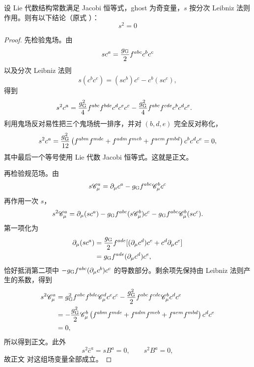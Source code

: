 \begin{proposition}
设 Lie 代数结构常数满足 Jacobi 恒等式，ghost 为奇变量，$s$ 按分次 Leibniz 法则作用。则有以下结论（原式 ）：
\begin{equation*}
 \boxed{s^2=0}
\end{equation*}
\end{proposition}
\begin{proof}
先检验鬼场。由
\begin{equation*}
 sc^a=\frac{g_{\rm G}}2f^{abc}c^bc^c
\end{equation*}
以及分次 Leibniz 法则
\begin{equation*}
 s(c^bc^c)=(sc^b)c^c-c^b(sc^c),
\end{equation*}
得到
\begin{align*}
 s^2c^a
 &=\frac{g_{\rm G}^2}{4}f^{abc}f^{bde}c^dc^ec^c
 -\frac{g_{\rm G}^2}{4}f^{abc}f^{cde}c^bc^dc^e.
\end{align*}
利用鬼场反对易性把三个鬼场统一排序，并对 $(b,d,e)$ 完全反对称化，
\begin{equation*}
 s^2c^a
 =\frac{g_{\rm G}^2}{12}
 \left(
 f^{abm}f^{mde}
 +f^{adm}f^{meb}
 +f^{aem}f^{mbd}
 \right)c^bc^dc^e=0,
\end{equation*}
其中最后一个等号使用 Lie 代数 Jacobi 恒等式。这就是正文。

再检验规范场。由
\begin{equation*}
 s\mathscr C_\mu^a
 =\partial_\mu c^a-g_{\rm G}f^{abc}\mathscr C_\mu^bc^c
\end{equation*}
再作用一次 $s$，
\begin{equation*}
 s^2\mathscr C_\mu^a
 =\partial_\mu(sc^a)
 -g_{\rm G}f^{abc}(s\mathscr C_\mu^b)c^c
 -g_{\rm G}f^{abc}\mathscr C_\mu^b(sc^c).
\end{equation*}
第一项化为
\begin{align*}
 \partial_\mu(sc^a)
 &=\frac{g_{\rm G}}2f^{ade}
 [ (\partial_\mu c^d)c^e+c^d\partial_\mu c^e]\\
 &=g_{\rm G}f^{ade}(\partial_\mu c^d)c^e,
\end{align*}
恰好抵消第二项中
$-g_{\rm G}f^{abc}(\partial_\mu c^b)c^c$ 的导数部分。剩余项先保持由 Leibniz 法则产生的系数，得到
\begin{align*}
 s^2\mathscr C_\mu^a
 &=g_{\rm G}^2f^{abc}f^{bde}\mathscr C_\mu^d c^e c^c
 -\frac{g_{\rm G}^2}{2}f^{abc}f^{cde}\mathscr C_\mu^b c^dc^e\\
 &=-\frac{g_{\rm G}^2}{2}\mathscr C_\mu^b
 \left(
 f^{abm}f^{mde}
 +f^{adm}f^{meb}
 +f^{aem}f^{mbd}
 \right)c^dc^e\\
 &=0,
\end{align*}
所以得到正文。此外
\begin{equation*}
 s^2\bar c^a=sB^a=0,
 \qquad
 s^2B^a=0,
\end{equation*}
故正文 对这组场变量全部成立。
\end{proof}

